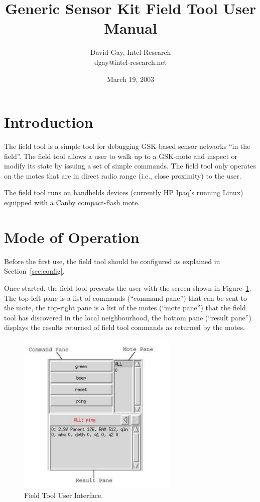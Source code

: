 \documentclass{article}
\begin{document}
\parindent 0cm
\parskip 0.3cm

\title{Generic Sensor Kit Field Tool User Manual}
\author{David Gay, Intel Research \\
dgay@intel-research.net}
\date{March 19, 2003}
\maketitle

\section{Introduction}

The field tool is a simple tool for debugging GSK-based sensor networks
``in the field''. The field tool allows a user to walk up to a GSK-mote and
inspect or modify its state by issuing a set of simple commands. The field
tool only operates on the motes that are in direct radio range (i.e., close
proximity) to the user.

The field tool runs on handhelds devices (currently HP Ipaq's running Linux)
equipped with a Canby compact-flash mote.

\section{Mode of Operation}

Before the first use, the field tool should be configured as explained
in Section~\ref{sec:config}.

Once started, the field tool presents the user with the screen shown in
Figure~\ref{fig:toolview}. The top-left pane is a list of commands
(``command pane'') that can be sent to the mote, the top-right pane is a
list of the motes (``mote pane'') that the field tool has discovered in the
local neighbourhood, the bottom pane (``result pane'') displays the results
returned of field tool commands as returned by the motes.

\begin{figure}[t]
\begin{center}
\includegraphics[width=3in]{./gui.pdf}
\end{center}
\caption{Field Tool User Interface.}
\label{fig:toolview}
\end{figure}
\end{document}
